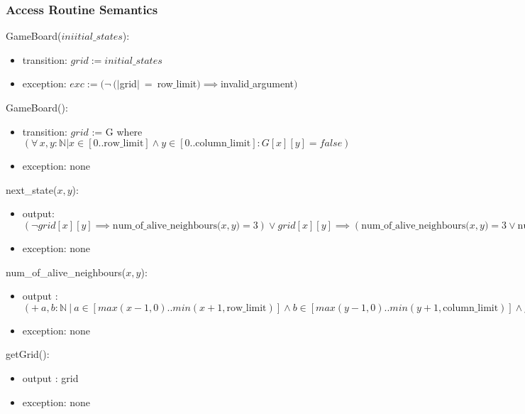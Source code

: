 \documentclass[12pt]{article}
\begin{document}
\subsubsection* {Access Routine Semantics}

\noindent GameBoard($\mathit{iniitial\_states}$):
\begin{itemize}
\item transition: 
$grid := \mathit{initial\_states} $
\item exception: $exc := ( \lnot \ (|$grid$| \  = \ $row$ \_$limit$ ) \implies $invalid$\_$argument$)$
\end{itemize}

\noindent GameBoard():
\begin{itemize}
\item transition: 
$grid$ := G where $(\forall\, x, y: \mathbb{N} | x \in [0..\text{row\_limit}] \wedge y \in [0..\text{column\_limit}]: G[x][y] = false)$
 
\item exception: none
\end{itemize}

\noindent next\_state($x, y$):
\begin{itemize}
\item output: 
$(\lnot grid[x][y] \implies \text{num\_of\_alive\_neighbours($x, y$)} = 3) \lor grid[x][y] \implies (\text{num\_of\_alive\_neighbours($x, y$)} = 3 \lor \text{num\_of\_alive\_neighbours($x, y$)} = 2) )$
\item exception: none

\end{itemize}

\noindent num\_of\_alive\_neighbours($x, y$):
\begin{itemize}
\item output : $ (+ \ a, b : \mathbb{N} \ | \ a \in [ max(x-1, 0)..min(x+1, \text{row\_limit})] \wedge b \in [ max(y-1, 0)..min(y+1, \text{column\_limit})] \wedge grid[a][b] : 1)$\\

\item exception: none

\end{itemize}

\noindent getGrid():
\begin{itemize}
\item output : grid

\item exception: none

\end{itemize}
\end{document}
